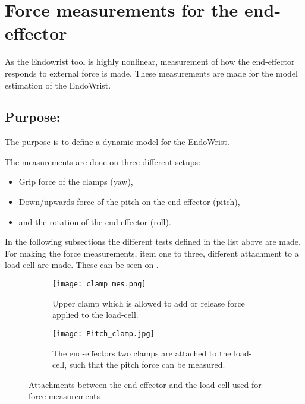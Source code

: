 \section{Force measurements for the end-effector} %

As the Endowrist tool is highly nonlinear, measurement of how the end-effector responds to external force is made. These measurements are made for the model estimation of the EndoWrist.  

\subsection*{Purpose:}
The purpose is to define a dynamic model for the EndoWrist.

The measurements are done on three different setups:
\begin{itemize}
\item Grip force of the clamps (yaw),
\item Down/upwards force of the pitch on the end-effector (pitch),
\item and the rotation of the end-effector (roll).
\end{itemize}

In the following subsections the different tests defined in the list above are made. For making the force measurements, item one to three, different attachment to a load-cell are made. These can be seen on .

\begin{figure}[H]
	\centering
	\begin{subfigure}{.48\textwidth}
		\centering
		\vspace{-12pt}
		\texttt{[image: clamp\_mes.png]}
		\caption{Upper clamp which is allowed to add or release force applied to the load-cell.}
		\label{fig:one_clamp}
	\end{subfigure}
	\begin{subfigure}{.48\textwidth}
		\centering
		\texttt{[image: Pitch\_clamp.jpg]}
		\caption{The end-effectors two clamps are attached to the load-cell, such that the pitch force can be measured.}
		\label{fig:pitch_force}
	\end{subfigure}
\caption{Attachments between the end-effector and the load-cell used for force measurements}
\label{fig:Overview_endowrist_attachment}
\end{figure}

